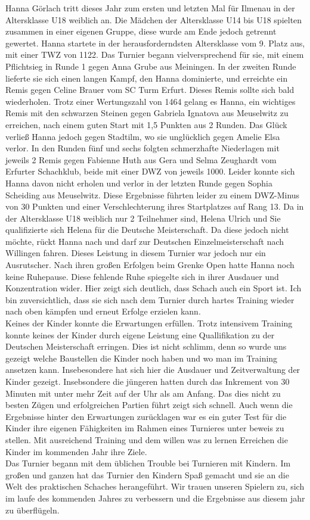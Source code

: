 \documentclass[a4paper,ngerman]{tui-algo-seminar}
\begin{document}
Hanna Görlach tritt dieses Jahr zum ersten und letzten Mal für Ilmenau in der Altersklasse U18 weiblich an.  Die Mädchen der Altersklasse U14 bis U18 spielten zusammen in einer eigenen Gruppe, diese wurde am Ende jedoch getrennt gewertet. Hanna startete in der herausforderndsten Altersklasse vom 9. Platz aus, mit einer TWZ von 1122. Das Turnier begann vielversprechend für sie, mit einem Pflichtsieg in Runde 1 gegen Anna Grube aus Meiningen. In der zweiten Runde lieferte sie sich einen langen Kampf, den Hanna dominierte, und erreichte ein Remis gegen Celine Brauer vom SC Turm Erfurt. Dieses Remis sollte sich bald wiederholen. Trotz einer Wertungszahl von 1464 gelang es Hanna, ein wichtiges Remis mit den schwarzen Steinen gegen Gabriela Ignatova aus Meuselwitz zu erreichen, nach einem guten Start mit 1,5 Punkten aus 2 Runden.
Das Glück verließ Hanna jedoch gegen Stadtilm, wo sie unglücklich gegen Amelie Elsa verlor. In den Runden fünf und sechs folgten schmerzhafte Niederlagen mit jeweils 2 Remis gegen Fabienne Huth aus Gera und Selma Zeughardt vom Erfurter Schachklub, beide mit einer DWZ von jeweils 1000. Leider konnte sich Hanna davon nicht erholen und verlor in der letzten Runde gegen Sophia Scheiding aus Meuselwitz. Diese Ergebnisse führten leider zu einem DWZ-Minus von 30 Punkten und einer Verschlechterung ihres Startplatzes auf Rang 13. Da in der Altersklasse U18 weiblich nur 2 Teilnehmer sind, Helena Ulrich und Sie qualifizierte sich Helena für die Deutsche Meisterschaft. Da diese jedoch nicht möchte, rückt Hanna nach und darf zur Deutschen Einzelmeisterschaft nach Willingen fahren.
Dieses Leistung in diesem Turnier war jedoch nur ein Ausrutscher. Nach ihren großen Erfolgen beim Grenke Open hatte Hanna noch keine Ruhepause. Diese fehlende Ruhe spiegelte sich in ihrer Ausdauer und Konzentration wider. Hier zeigt sich deutlich, dass Schach auch ein Sport ist.
Ich bin zuversichtlich, dass sie sich nach dem Turnier durch hartes Training wieder nach oben kämpfen und erneut Erfolge erzielen kann.\\

Keines der Kinder konnte die Erwartungen erfüllen. Trotz intensivem Training konnte keines der Kinder durch eigene Leistung eine Quallifikation zu der Deutschen Meisterschaft erringen. Dies ist nicht schlimm, denn so wurde uns gezeigt welche Baustellen die Kinder noch haben und wo man im Training ansetzen kann. Insebesondere hat sich hier die Ausdauer und Zeitverwaltung der Kinder gezeigt. Insebsondere die jüngeren hatten durch das Inkrement von 30 Minuten mit unter mehr Zeit auf der Uhr als am Anfang. Das dies nicht zu besten Zügen und erfolgreichen Partien führt zeigt sich schnell.  Auch wenn die Ergebnisse hinter den Erwartungen zurücklagen war es ein guter Test für die Kinder ihre eigenen Fähigkeiten im Rahmen eines Turnieres unter beweis zu stellen. Mit ausreichend Training und dem willen was zu lernen Erreichen die Kinder im kommenden Jahr ihre Ziele.
\\
Das Turnier begann mit dem üblichen Trouble bei Turnieren mit Kindern. Im großen und ganzen hat das Turnier den Kindern Spaß gemacht und sie an die Welt des praktischen Schaches herangeführt. Wir trauen unseren Spielern zu, sich im laufe des kommenden Jahres zu verbessern und die Ergebnisse aus diesem jahr zu überflügeln.
\end{document}
